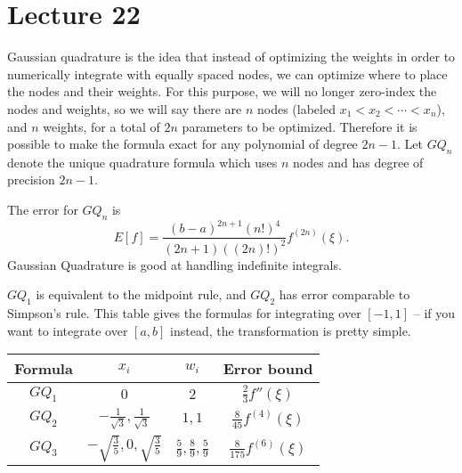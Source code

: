 \documentclass{article}
\begin{document}
\section{Lecture 22}
Gaussian quadrature is the idea that instead of optimizing the weights in order to numerically integrate with equally spaced nodes, we can optimize where to place the nodes and their weights. For this purpose, we will no longer zero-index the nodes and weights, so we will say there are $n$ nodes (labeled $x_1 < x_2 < \cdots < x_n$), and $n$ weights, for a total of $2n$ parameters to be optimized. Therefore it is possible to make the formula exact for any polynomial of degree $2n-1$. Let $GQ_n$ denote the unique quadrature formula which uses $n$ nodes and has degree of precision $2n-1$.
\par
The error for $GQ_n$ is
\[ E[f] = \frac{(b-a)^{2n+1}(n!)^4}{(2n+1)((2n)!)^2} f^{(2n)}(\xi). \]
Gaussian Quadrature is good at handling indefinite integrals.
\par
$GQ_1$ is equivalent to the midpoint rule, and $GQ_2$ has error comparable to Simpson's rule. This table gives the formulas for integrating over $[-1,1]$ -- if you want to integrate over $[a,b]$ instead, the transformation is pretty simple.
\begin{center}
    \begin{tabular}{|c|c|c|c|}
        \hline
        Formula & $x_i$ & $w_i$ & Error bound \\
        \hline
        \hline
        $GQ_1$ & $0$ & $2$ & $ \frac{2}{3} f''(\xi)$ \\
        \hline
        $GQ_2$ & $ - \frac{1}{\sqrt{3}}, \frac{1}{\sqrt{3}}$ & $1, 1$ & $ \frac{8}{45} f^{(4)}(\xi)$ \\
        \hline
        $GQ_3$ & $- \sqrt{ \frac{3}{5}}, 0, \sqrt{ \frac{3}{5}}$ & $ \frac{5}{9}, \frac{8}{9}, \frac{5}{9}$ & $ \frac{8}{175} f^{(6)}(\xi)$ \\
        \hline
    \end{tabular}
\end{center}
\end{document}
